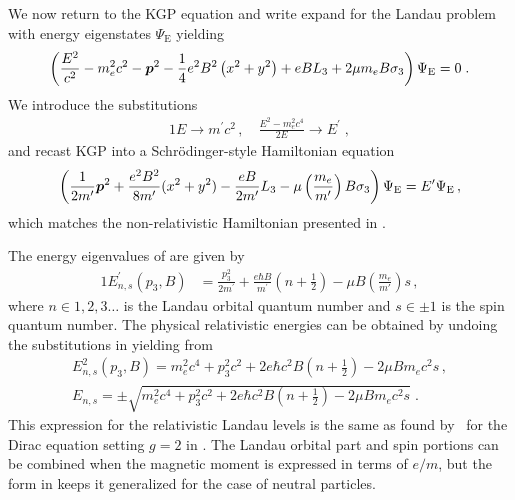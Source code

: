 We now return to the KGP equation and write expand  for the Landau problem with energy eigenstates $\Psi_\mathrm{E}$ yielding
\begin{alignat}{1}
    \label{lan09}
    \left(\frac{E^{2}}{c^{2}}-m_{e}^{2}c^{2}-\boldsymbol{p}^{2}-\frac{1}{4}e^{2}B^{2}\left(x^{2}+y^{2}\right)+eBL_{3}+2\mu m_{e} B\sigma_{3}\right)\Psi_\mathrm{E}=0\;.
\end{alignat} 
We introduce the substitutions 
\begin{alignat}{1}
    \label{lan10}
    E\to m^\prime c^{2}\,,\quad \frac{E^{2}-m_{e}^{2}c^{4}}{2E}\to E^\prime\;,
\end{alignat} 
and recast KGP  into a Schr{\"o}dinger-style Hamiltonian equation
\begin{gather}
	\label{lan11} \left(\frac{1}{2m'}\boldsymbol{p}^{2}+\frac{e^{2}B^{2}}{8m'}(x^{2}+y^{2})-\frac{eB}{2m'}L_{3}-\mu\left(\frac{m_{e}}{m'}\right)B\sigma_{3}\right)\Psi_\mathrm{E}=E'\Psi_\mathrm{E}\,,
\end{gather}
which matches the non-relativistic Hamiltonian presented in .

The energy eigenvalues of  are given by
\begin{alignat}{1}
    \label{lan23}
    E^\prime_{n,s}(p_{3},B)&=\frac{p_{3}^{2}}{2m^\prime }+\frac{e\hbar B}{m^\prime}\left(n+\frac{1}{2}\right)-\mu B\left(\frac{m_{e}}{m'}\right)s\,,
\end{alignat}
where $n\in1,2,3\ldots$ is the Landau orbital quantum number and $s\in\pm1$ is the spin quantum number. The physical relativistic energies can be obtained by undoing the substitutions in  yielding from 
\begin{gather}
\label{lan24}
E^{2}_{n,s}(p_{3},B)=m_{e}^{2}c^{4}+p_{3}^{2}c^{2}+2e\hbar c^{2}B\left(n+\frac{1}{2}\right)-2\mu B m_{e}c^{2}s\,,\\
\label{lan24b}
E_{n,s}=\pm\sqrt{m_{e}^{2}c^{4}+p_{3}^{2}c^{2}+2e\hbar c^{2}B\left(n+\frac{1}{2}\right)-2\mu B m_{e}c^{2}s}\;.
\end{gather}
This expression for the relativistic Landau levels is the same as found by~\cite{Weisskopf:1936hya} for the Dirac equation setting $g\!=\!2$ in . The Landau orbital part and spin portions can be combined when the magnetic moment is expressed in terms of $e/m$, but the form in  keeps it generalized for the case of neutral particles.

